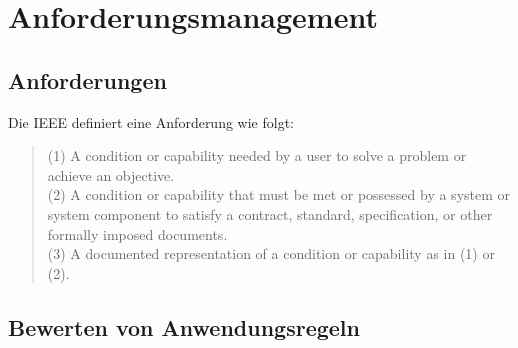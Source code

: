 \section{Anforderungsmanagement}
\label{chap:Anforderungsmanagement}

\subsection{Anforderungen}
Die IEEE definiert eine Anforderung wie folgt: 
\begin{quote}
    (1) A condition or capability needed by a user to solve a problem or achieve an objective.\\
    (2) A condition or capability that must be met
        or possessed by a system or system component to satisfy a contract, standard, specification, or other formally imposed documents.\\
    (3) A documented representation of a condition or capability as in (1) or (2). \cite[S.62]{IEEE_Glossary}
\end{quote}
\subsection{Bewerten von Anwendungsregeln}
